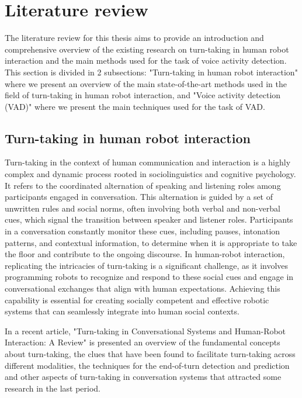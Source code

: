 \documentclass[../main.tex]{subfiles}
\begin{document}
\section{Literature review}
\label{literature review}

The literature review for this thesis aims to provide an introduction and comprehensive overview of the
existing research on turn-taking in human robot interaction and the main methods used for the task of voice activity detection. This section is divided in 2 subsections: "Turn-taking in human robot interaction" where we present an overview of the main state-of-the-art methods used in the field of turn-taking in human robot interaction, and "Voice activity detection (VAD)" where we present the main techniques used for the task of VAD.

\subsection{Turn-taking in human robot interaction}
\label{turn-taking}

Turn-taking in the context of human communication and interaction is a highly complex and dynamic process rooted in sociolinguistics and cognitive psychology. It refers to the coordinated alternation of speaking and listening roles among participants engaged in conversation. This alternation is guided by a set of unwritten rules and social norms, often involving both verbal and non-verbal cues, which signal the transition between speaker and listener roles. Participants in a conversation constantly monitor these cues, including pauses, intonation patterns, and contextual information, to determine when it is appropriate to take the floor and contribute to the ongoing discourse. In human-robot interaction, replicating the intricacies of turn-taking is a significant challenge, as it involves programming robots to recognize and respond to these social cues and engage in conversational exchanges that align with human expectations. Achieving this capability is essential for creating socially competent and effective robotic systems that can seamlessly integrate into human social contexts.

In a recent article, "Turn-taking in Conversational Systems and Human-Robot
Interaction: A Review" \cite{skantze2021turn} is presented an overview of the fundamental concepts about turn-taking, the clues that have been found to facilitate turn-taking across different modalities, the techniques for the end-of-turn detection and prediction and other aspects of turn-taking in conversation systems that attracted some research in the last period. 
\end{document}
